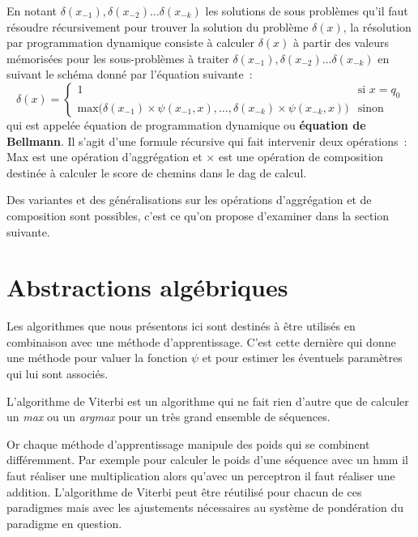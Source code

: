 \documentclass[11pt,openany]{book}
\newcommand{\ac}[1]{{\sc #1}} %
\newcommand{\kw}[1]{{\bf #1}} %
\begin{document}
En notant $\delta(x_{-1}) ,\delta(x_{-2})\ldots \delta(x_{-k})$ 
les solutions de sous problèmes qu'il faut résoudre récursivement pour
trouver la solution du problème $\delta(x)$, la résolution par
programmation dynamique consiste à calculer $\delta(x)$
à partir des valeurs mémorisées pour les sous-problèmes à traiter $\delta(x_{-1}) ,\delta(x_{-2})\ldots \delta(x_{-k})$ 
en suivant le schéma donné par l'équation suivante~:
\begin{equation}
\label{eq-bellmann}
\delta(x) = \left\{ 
\begin{array}{ll}
1 & \text{si }  x = q_0\\
\text{max} \bigg( \delta(x_{-1}) \times \psi(x_{-1},x), \ldots ,\delta(x_{-k}) \times \psi(x_{-k},x) \bigg) &\text{sinon}
\end{array}
\right.
\end{equation}
qui est appelée équation de programmation dynamique ou \kw{équation de
  Bellmann}. Il s'agit d'une formule récursive 
qui fait intervenir deux opérations~: {\sc Max} 
 est une opération d'aggrégation et $\times$ est une opération de
 composition destinée à calculer le score de chemins dans le \ac{dag}
de calcul. 

Des variantes et des généralisations sur les opérations d'aggrégation et de composition sont
possibles, c'est ce qu'on propose d'examiner dans la section suivante.

\section{Abstractions algébriques}
\label{sec-semi-ring}

Les algorithmes que nous présentons ici sont destinés à être utilisés
en combinaison avec une méthode d'apprentissage.
C'est cette dernière
qui donne une méthode pour valuer la fonction $\psi$ et pour estimer
les éventuels paramètres qui lui sont associés.

L'algorithme de Viterbi est un algorithme qui ne fait rien
d'autre que de calculer un {\sl max} ou un {\sl argmax} pour un
très grand ensemble de séquences.

Or chaque méthode d'apprentissage manipule des poids qui se combinent
différemment. Par exemple pour calculer le poids d'une séquence avec
un \ac{hmm} il faut réaliser une multiplication alors qu'avec un
perceptron il faut réaliser une addition. L'algorithme de Viterbi peut
être réutilisé pour chacun de ces paradigmes mais avec les ajustements
nécessaires au système de pondération du paradigme en question.
\end{document}
